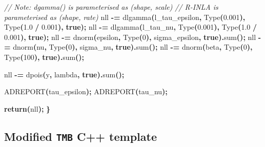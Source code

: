\documentclass[a4paper, nobind]{templates/ociamthesis}
\newenvironment{Shaded}{\begin{snugshade}}{\end{snugshade}}
\newcommand{\CommentTok}[1]{\textcolor[rgb]{0.56,0.35,0.01}{\textit{#1}}}
\newcommand{\ControlFlowTok}[1]{\textcolor[rgb]{0.13,0.29,0.53}{\textbf{#1}}}
\newcommand{\DecValTok}[1]{\textcolor[rgb]{0.00,0.00,0.81}{#1}}
\newcommand{\FloatTok}[1]{\textcolor[rgb]{0.00,0.00,0.81}{#1}}
\newcommand{\KeywordTok}[1]{\textcolor[rgb]{0.13,0.29,0.53}{\textbf{#1}}}
\newcommand{\NormalTok}[1]{#1}
\newcommand{\OperatorTok}[1]{\textcolor[rgb]{0.81,0.36,0.00}{\textbf{#1}}}
\renewenvironment{Shaded}
{
  \vspace{10pt}%
  \begin{snugshade}%
}{%
  \end{snugshade}%
  \vspace{8pt}%
}
\begin{document}
\begin{Shaded}
\begin{Highlighting}[]
  \CommentTok{// Note: dgamma() is parameterised as (shape, scale)}
  \CommentTok{// R{-}INLA is parameterised as (shape, rate)}
\NormalTok{  nll }\OperatorTok{{-}=}\NormalTok{ dlgamma}\OperatorTok{(}\NormalTok{l\_tau\_epsilon}\OperatorTok{,}\NormalTok{ Type}\OperatorTok{(}\FloatTok{0.001}\OperatorTok{),}\NormalTok{ Type}\OperatorTok{(}\FloatTok{1.0} \OperatorTok{/} \FloatTok{0.001}\OperatorTok{),} \KeywordTok{true}\OperatorTok{);}
\NormalTok{  nll }\OperatorTok{{-}=}\NormalTok{ dlgamma}\OperatorTok{(}\NormalTok{l\_tau\_nu}\OperatorTok{,}\NormalTok{ Type}\OperatorTok{(}\FloatTok{0.001}\OperatorTok{),}\NormalTok{ Type}\OperatorTok{(}\FloatTok{1.0} \OperatorTok{/} \FloatTok{0.001}\OperatorTok{),} \KeywordTok{true}\OperatorTok{);}
\NormalTok{  nll }\OperatorTok{{-}=}\NormalTok{ dnorm}\OperatorTok{(}\NormalTok{epsilon}\OperatorTok{,}\NormalTok{ Type}\OperatorTok{(}\DecValTok{0}\OperatorTok{),}\NormalTok{ sigma\_epsilon}\OperatorTok{,} \KeywordTok{true}\OperatorTok{).}\NormalTok{sum}\OperatorTok{();}
\NormalTok{  nll }\OperatorTok{{-}=}\NormalTok{ dnorm}\OperatorTok{(}\NormalTok{nu}\OperatorTok{,}\NormalTok{ Type}\OperatorTok{(}\DecValTok{0}\OperatorTok{),}\NormalTok{ sigma\_nu}\OperatorTok{,} \KeywordTok{true}\OperatorTok{).}\NormalTok{sum}\OperatorTok{();}
\NormalTok{  nll }\OperatorTok{{-}=}\NormalTok{ dnorm}\OperatorTok{(}\NormalTok{beta}\OperatorTok{,}\NormalTok{ Type}\OperatorTok{(}\DecValTok{0}\OperatorTok{),}\NormalTok{ Type}\OperatorTok{(}\DecValTok{100}\OperatorTok{),} \KeywordTok{true}\OperatorTok{).}\NormalTok{sum}\OperatorTok{();}
  
\NormalTok{  nll }\OperatorTok{{-}=}\NormalTok{ dpois}\OperatorTok{(}\NormalTok{y}\OperatorTok{,}\NormalTok{ lambda}\OperatorTok{,} \KeywordTok{true}\OperatorTok{).}\NormalTok{sum}\OperatorTok{();}
  
\NormalTok{  ADREPORT}\OperatorTok{(}\NormalTok{tau\_epsilon}\OperatorTok{);}
\NormalTok{  ADREPORT}\OperatorTok{(}\NormalTok{tau\_nu}\OperatorTok{);}
  
  \ControlFlowTok{return}\OperatorTok{(}\NormalTok{nll}\OperatorTok{);}
\OperatorTok{\}}
\end{Highlighting}
\end{Shaded}

\hypertarget{tmb-modified-epil}{%
\subsection{\texorpdfstring{Modified \texttt{TMB} C++ template}{Modified TMB C++ template}}\label{tmb-modified-epil}}
\end{document}
